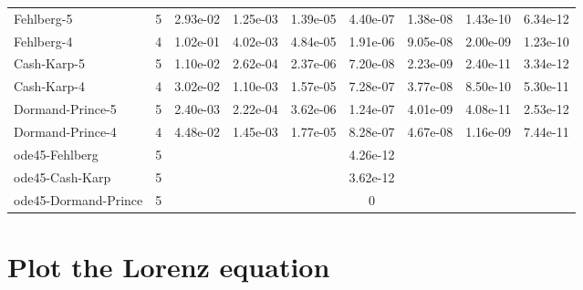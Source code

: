 \documentclass[conference,onecolumn,12pt]{IEEEtran}
\begin{document}
\begin{table}[htbp]
{\begin{tabular}{lrccccccc}
    Fehlberg-5 & 5     & \multicolumn{1}{r}{2.93e-02} & \multicolumn{1}{r}{1.25e-03} & \multicolumn{1}{r}{1.39e-05} & \multicolumn{1}{r}{4.40e-07} & \multicolumn{1}{r}{1.38e-08} & \multicolumn{1}{r}{1.43e-10} & \multicolumn{1}{r}{6.34e-12} \\
    Fehlberg-4 & 4     & \multicolumn{1}{r}{1.02e-01} & \multicolumn{1}{r}{4.02e-03} & \multicolumn{1}{r}{4.84e-05} & \multicolumn{1}{r}{1.91e-06} & \multicolumn{1}{r}{9.05e-08} & \multicolumn{1}{r}{2.00e-09} & \multicolumn{1}{r}{1.23e-10} \\
    Cash-Karp-5 & 5     & \multicolumn{1}{r}{1.10e-02} & \multicolumn{1}{r}{2.62e-04} & \multicolumn{1}{r}{2.37e-06} & \multicolumn{1}{r}{7.20e-08} & \multicolumn{1}{r}{2.23e-09} & \multicolumn{1}{r}{2.40e-11} & \multicolumn{1}{r}{3.34e-12} \\
    Cash-Karp-4 & 4     & \multicolumn{1}{r}{3.02e-02} & \multicolumn{1}{r}{1.10e-03} & \multicolumn{1}{r}{1.57e-05} & \multicolumn{1}{r}{7.28e-07} & \multicolumn{1}{r}{3.77e-08} & \multicolumn{1}{r}{8.50e-10} & \multicolumn{1}{r}{5.30e-11} \\
    Dormand-Prince-5 & 5     & \multicolumn{1}{r}{2.40e-03} & \multicolumn{1}{r}{2.22e-04} & \multicolumn{1}{r}{3.62e-06} & \multicolumn{1}{r}{1.24e-07} & \multicolumn{1}{r}{4.01e-09} & \multicolumn{1}{r}{4.08e-11} & \multicolumn{1}{r}{2.53e-12} \\
    Dormand-Prince-4 & 4     & \multicolumn{1}{r}{4.48e-02} & \multicolumn{1}{r}{1.45e-03} & \multicolumn{1}{r}{1.77e-05} & \multicolumn{1}{r}{8.28e-07} & \multicolumn{1}{r}{4.67e-08} & \multicolumn{1}{r}{1.16e-09} & \multicolumn{1}{r}{7.44e-11} \\
    ode45-Fehlberg & 5     & \multicolumn{7}{c}{4.26e-12} \\
    ode45-Cash-Karp & 5     & \multicolumn{7}{c}{3.62e-12} \\
    ode45-Dormand-Prince & 5     & \multicolumn{7}{c}{0} \\
    \bottomrule
    \end{tabular}%
  }
  \label{tab:4}%
\end{table}%


\clearpage

\section{Plot the Lorenz equation}
\end{document}
